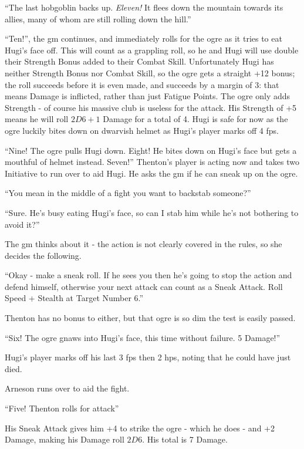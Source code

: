 \begin{multicols}{2}
{\begin{exampletext}
		``The last hobgoblin backs up. \textit{Eleven!} It flees down the mountain towards its allies, many of whom are still rolling down the hill.''

		``Ten!'', the \gls{gm} continues, and immediately rolls for the ogre as it tries to eat Hugi's face off.
		This will count as a grappling roll, so he and Hugi will use double their Strength Bonus added to their Combat Skill.
		Unfortunately Hugi has neither Strength Bonus nor Combat Skill, so the ogre gets a straight +12 bonus; the roll succeeds before it is even made, and succeeds by a margin of 3: that means Damage is inflicted, rather than just Fatigue Points.
		The ogre only adds Strength - of course his massive club is useless for the attack.
		His Strength of +5 means he will roll $2D6+1$ Damage for a total of 4. Hugi is safe for now as the ogre luckily bites down on dwarvish helmet as Hugi's player marks off 4 \glspl{fp}.

		``Nine! The ogre pulls Hugi down. Eight! He bites down on Hugi's face but gets a mouthful of helmet instead. Seven!''
		Thenton's player is acting now and takes two Initiative to run over to aid Hugi. He asks the \gls{gm} if he can sneak up on the ogre.

		``You mean in the middle of a fight you want to backstab someone?''

		``Sure. He's busy eating Hugi's face, so can I stab him while he's not bothering to avoid it?''

		The \gls{gm} thinks about it - the action is not clearly covered in the rules, so she decides the following.

		``Okay - make a sneak roll. If he sees you then he's going to stop the action and defend himself, otherwise your next attack can count as a Sneak Attack. Roll Speed + Stealth at Target Number 6.''

		Thenton has no bonus to either, but that ogre is so dim the test is easily passed. 

		``Six! The ogre gnaws into Hugi's face, this time without failure. 5 Damage!''

		Hugi's player marks off his last 3 \glspl{fp} then 2 \glspl{hp}, noting that he could have just died.

		Arneson runs over to aid the fight.

``Five! Thenton rolls for attack''

His Sneak Attack gives him +4 to strike the ogre - which he does - and +2 Damage, making his Damage roll $2D6$. His total is 7 Damage.


\end{exampletext}}
\end{multicols}
